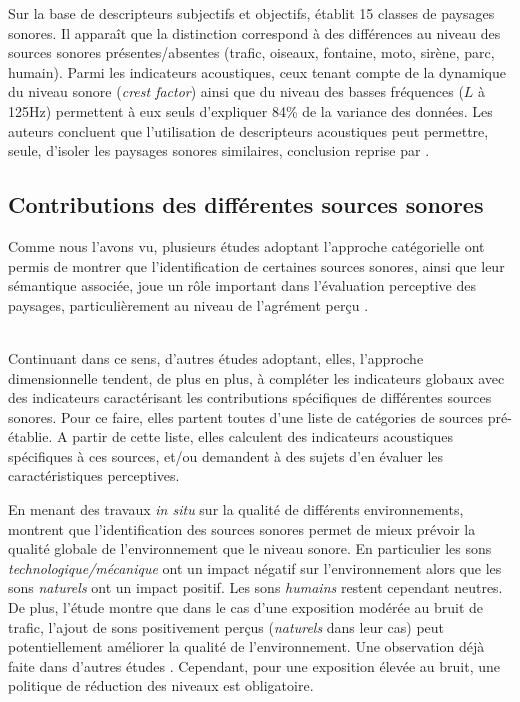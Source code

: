 {{Sur la base de descripteurs subjectifs et objectifs, \citep{torija2013application} établit 15 classes de paysages sonores. Il apparaît que la distinction correspond à des différences au niveau des sources sonores présentes/absentes (trafic, oiseaux, fontaine, moto, sirène, parc, humain). Parmi les indicateurs acoustiques, ceux tenant compte de la dynamique du niveau sonore (\emph{crest factor}) ainsi que du niveau des basses fréquences ($L$ à 125Hz) permettent à eux seuls d'expliquer 84\% de la variance des données. Les auteurs concluent que l'utilisation de descripteurs acoustiques peut permettre, seule, d'isoler les paysages sonores similaires, conclusion reprise par \citep{rychtarikova2013soundscape}.


\subsection{Contributions des différentes sources sonores}
\label{sec:ch3_contribSource}

Comme nous l'avons vu, plusieurs études adoptant l'approche catégorielle ont permis de montrer que l'identification de certaines sources sonores, ainsi que leur sémantique associée, joue un rôle important dans l'évaluation perceptive des paysages, particulièrement au niveau de l'agrément perçu \citep{guastavino2006ideal,szeremeta2009analysis}.

\\

Continuant dans ce sens, d'autres études adoptant, elles, l'approche dimensionnelle tendent, de plus en plus, à compléter les indicateurs globaux avec des indicateurs caractérisant les contributions spécifiques de différentes sources sonores. Pour ce faire, elles partent toutes d'une liste de catégories de sources pré-établie. A partir de cette liste, elles calculent des indicateurs acoustiques spécifiques à ces sources, et/ou demandent à des sujets d'en évaluer les caractéristiques perceptives.

En menant des travaux \emph{in situ} sur la qualité de différents environnements, \citep{nilsson2007acoustic,nilsson2007soundscape} montrent que l'identification des sources sonores permet de mieux prévoir la qualité globale de l'environnement que le niveau sonore. En particulier les sons \emph{technologique/mécanique} ont un impact négatif sur l'environnement alors que les sons \emph{naturels} ont un impact positif. Les sons \emph{humains} restent cependant neutres. De plus, l'étude montre que dans le cas d'une exposition modérée au bruit de trafic, l'ajout de sons positivement perçus (\emph{naturels} dans leur cas) peut potentiellement améliorer la qualité de l'environnement. Une observation déjà faite dans d'autres études \citep{hong2013designing,galbrun2012perceptual}. Cependant, pour une exposition élevée au bruit, une politique de réduction des niveaux est obligatoire.

}}
